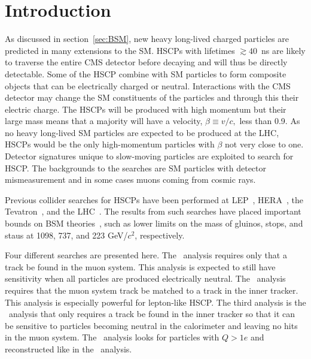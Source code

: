 \section{Introduction}
As discussed in section~\ref{sec:BSM}, new heavy long-lived charged particles are predicted in many extensions to the SM. HSCPs with
lifetimes $\gtrsim 40$~ns are likely to traverse the entire CMS detector before decaying and will thus be directly detectable.
Some of the HSCP combine with SM particles to form composite objects that can be electrically charged or neutral.
Interactions with the CMS detector may change the SM constituents of the particles and through this their electric charge.
The HSCPs will be produced with high momentum but their large mass means that
a majority will have a velocity, $\beta \equiv v/c,$ less than 0.9. 
As no heavy long-lived SM particles are expected to be produced at the LHC, HSCPs would be the only high-momentum particles with $\beta$ not very close to one.
Detector signatures unique to slow-moving particles are exploited to search for HSCP. 
The backgrounds to the searches are SM particles with detector mismeasurement and in some cases
muons coming from cosmic rays.

Previous collider searches for HSCPs have been performed at LEP~\cite{Barate:1997dr, Abreu:2000tn, Achard:2001qw, Abbiendi:2003yd}, HERA~\cite{Aktas:2004pq},
the Tevatron~\cite{Abazov:2008qu, Aaltonen:2009kea, Abazov:2011pf,Abazov:2012ab},
and the LHC~\cite{Khachatryan:2011ts, Aad:2011mb,  Aad:2011yf, Aad:2011hz, CMS:2012xi, Chatrchyan:2012sp, Aad:2012vd, Aad:2013pqd}.
The results from such searches have placed important bounds on BSM theories~\cite{Berger:2008cq, CahillRowley:2012kx}, such as lower limits on the
mass of gluinos, stops, and staus at 1098,
737, and 223 GeV/$c^2$, respectively.

Four different searches are presented here. The \muononly\ analysis requires only that a track be found in the muon system.
This analysis is expected to still have sensitivity when all particles are produced electrically neutral. The
\tktof\ analysis requires that the muon system track be matched to a track in the inner tracker. This analysis is especially
powerful for lepton-like HSCP. The third analysis is the \tkonly\ analysis that only requires a track be found in the inner tracker so that it can be sensitive to particles
becoming neutral in the calorimeter and leaving no hits in the muon system. The \multi\ analysis looks 
for particles with $Q > 1e$ and reconstructed like in the \tktof\ analysis.

